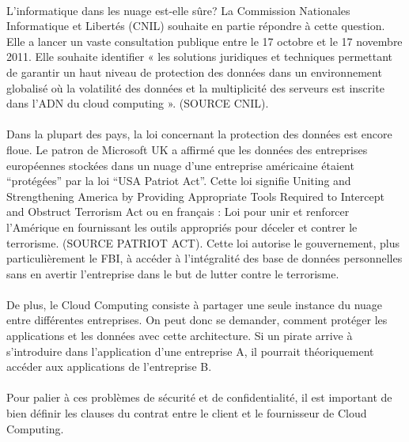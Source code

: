 \documentclass[a4paper,12pt]{report}
\begin{document}
\begin{onehalfspace}
	\paragraph*{}
	L’informatique dans les nuage est-elle sûre? La Commission Nationales Informatique et Libertés (CNIL) souhaite en partie répondre à cette question. Elle a lancer un vaste consultation publique entre le 17 octobre et le 17 novembre 2011. Elle souhaite identifier « les solutions juridiques et techniques permettant de garantir un haut niveau de protection des données dans un environnement globalisé où la volatilité des données et la multiplicité des serveurs est inscrite dans l'ADN du cloud computing ». (SOURCE CNIL).

	\paragraph*{}
	Dans la plupart des pays, la loi concernant la protection des données est encore floue. Le patron de Microsoft UK a affirmé que les données des entreprises européennes stockées dans un nuage d’une entreprise américaine étaient “protégées” par la loi “USA Patriot Act”. Cette loi signifie Uniting and Strengthening America by Providing Appropriate Tools Required to Intercept and Obstruct Terrorism Act ou en français : Loi pour unir et renforcer l'Amérique en fournissant les outils appropriés pour déceler et contrer le terrorisme. (SOURCE PATRIOT ACT). Cette loi autorise le gouvernement, plus particulièrement le FBI, à accéder à l’intégralité des base de données personnelles sans en avertir l’entreprise dans le but de lutter contre le terrorisme.

	\paragraph*{}
	De plus, le Cloud Computing consiste à partager une seule instance du nuage entre différentes entreprises. On peut donc se demander, comment protéger les applications et les données avec cette architecture. Si un pirate arrive à s’introduire dans l’application d’une entreprise A, il pourrait théoriquement accéder aux applications de l’entreprise B.

	\paragraph*{}
	Pour palier à ces problèmes de sécurité et de confidentialité, il est important de bien définir les clauses du contrat entre le client et le fournisseur de Cloud Computing.


\end{onehalfspace}
\end{document}
